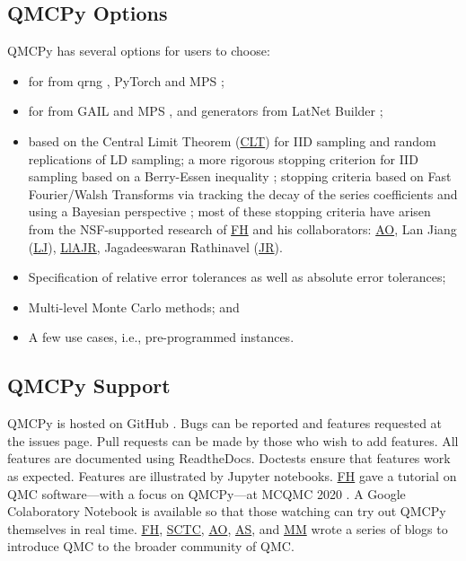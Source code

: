 \documentclass[11pt]{NSFamsart}
\newcommand{\FH}{\hyperlink{FHlink}{FH}\xspace}
\newcommand{\SCTC}{\hyperlink{SCTClink}{SCTC}\xspace}
\newcommand{\AO}{\hyperlink{AOlink}{AO}\xspace}
\newcommand{\MM}{\hyperlink{MMlink}{MM}\xspace}
\newcommand{\JR}{\hyperlink{JRlink}{JR}\xspace}
\newcommand{\LlAJR}{\hyperlink{LlAJRlink}{LlAJR}\xspace}
\newcommand{\LJ}{\hyperlink{LJlink}{LJ}\xspace}
\newcommand{\AS}{\hyperlink{ASlink}{AS}\xspace}
\newcommand{\CLT}{\hyperlink{CLTlink}{CLT}\xspace}
\begin{document}
 \subsection{QMCPy Options}
 QMCPy has several options for users to choose:
 \begin{itemize}
 	\item {} for  from  qrng \cite{QRNG2020},  PyTorch \cite{PyTorch} and MPS \cite{Nuy17a};

 	\item {} for  from GAIL \cite{ChoEtal20a} and MPS \cite{Nuy17a}, and generators  from LatNet Builder \cite{LatNet};

 	\item {} based on the \hypertarget{CLTlink}{Central Limit Theorem} (\CLT) for IID sampling and random replications of LD sampling;  a more rigorous stopping criterion for IID sampling based on a Berry-Essen inequality \cite{HicEtal14a};  stopping criteria based on Fast Fourier/Walsh Transforms via tracking the decay of the series coefficients \cite{HicJim16a, JimHic16a} and using a Bayesian perspective \cite{RatHic19a}; most of these stopping criteria have arisen from the NSF-supported research of \FH and his collaborators: \AO, \hypertarget{LJlink}{Lan Jiang} (\LJ),
 	\LlAJR, \hypertarget{JRlink}{Jagadeeswaran Rathinavel} (\JR).

 	\item Specification of relative error tolerances as well as absolute error tolerances;

 	\item Multi-level Monte Carlo methods; and

 	\item A few use cases, i.e., pre-programmed  instances.
 \end{itemize}

\subsection{QMCPy Support}
QMCPy is hosted on GitHub \cite{QMCPy2020a}. Bugs can be reported and features requested at the issues page.  Pull requests can be made by those who wish to add features.  All features are documented \cite{QMCPyDocs} using ReadtheDocs.  Doctests ensure that features work as expected. Features are illustrated by Jupyter notebooks.  \FH gave a tutorial on QMC software---with a focus on QMCPy---at MCQMC 2020 \cite{MCQMC2020QMCPyTut}.  A Google Colaboratory Notebook \cite{QMCPyTutColab2020} is available so that those watching  can try out QMCPy themselves in real time.  \FH, \SCTC, \AO, \AS, and \MM wrote a series of blogs \cite{QMCBlog} to introduce QMC to the broader community of QMC.
\end{document}
